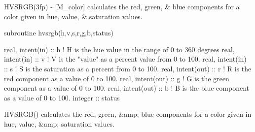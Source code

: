 \begin{DoxyDescription}
\item[\label{_HVSRGB}%
N\+A\+ME ]H\+V\+S\+R\+G\+B(3fp) -\/ \mbox{[}M\+\_\+color\mbox{]} calculates the red, green, \& blue components for a color given in hue, value, \& saturation values. 


\item[S\+Y\+N\+O\+P\+S\+IS ]
\begin{DoxyPre}
    subroutine hvsrgb(h,v,s,r,g,b,status)\end{DoxyPre}



\begin{DoxyPre}     real, intent(in)  :: h ! H is the hue value in the range of 0 to 360 degrees
     real, intent(in)  :: v ! V is the "value" as a percent value from 0 to 100.
     real, intent(in)  :: s ! S is the saturation as a percent from 0 to 100.
     real, intent(out) :: r ! R is the red component as a value of 0 to 100.
     real, intent(out) :: g ! G is the green component as a value of 0 to 100.
     real, intent(out) :: b ! B is the blue component as a value of 0 to 100.
     integer           :: status
    \end{DoxyPre}
 


\item[D\+E\+S\+C\+R\+I\+P\+T\+I\+ON ]\begin{DoxyVerb}HVSRGB() calculates the red, green, &amp; blue components for a
 color given in hue, value, &amp; saturation values.
\end{DoxyVerb}
 


\end{DoxyDescription}\mbox{\label{namespacem__color_ad6e8505eef5add299c4475d289f3c5c5}} 

